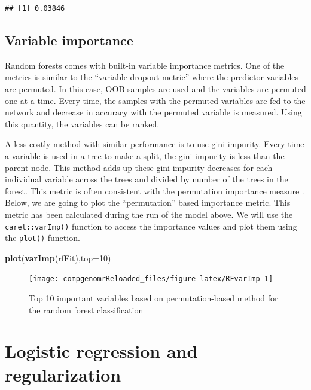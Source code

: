 \documentclass[12pt,]{krantz}
\newenvironment{Shaded}{\begin{snugshade}}{\end{snugshade}}
\newcommand{\DataTypeTok}[1]{\textcolor[rgb]{0.13,0.29,0.53}{#1}}
\newcommand{\DecValTok}[1]{\textcolor[rgb]{0.00,0.00,0.81}{#1}}
\newcommand{\KeywordTok}[1]{\textcolor[rgb]{0.13,0.29,0.53}{\textbf{#1}}}
\newcommand{\NormalTok}[1]{#1}
\begin{document}
\begin{verbatim}
## [1] 0.03846
\end{verbatim}

\hypertarget{variable-importance-1}{%
\subsection{Variable importance}\label{variable-importance-1}}

Random forests comes with built-in variable importance metrics. One of the metrics is similar to the ``variable dropout metric'' where the predictor variables are permuted. In this case, OOB samples are used and the variables are permuted one at a time. Every time, the samples with the permuted variables are fed to the network and decrease in accuracy with the permuted variable is measured. Using this quantity, the variables can be ranked.

A less costly method with similar performance is to use gini impurity. Every time a variable is used in a tree to make a split, the gini impurity is less than the parent node. This method adds up these gini impurity decreases for each individual variable across the trees and divided by number of the trees in the forest. This metric is often consistent with the permutation importance measure \citep{breiman2001random}. Below, we are going to plot the ``permutation'' based importance metric. This metric has been calculated during the run of the model above. We will use the \texttt{caret::varImp()} function to access the importance values and plot them using the \texttt{plot()} function.

\begin{Shaded}
\begin{Highlighting}[]
\KeywordTok{plot}\NormalTok{(}\KeywordTok{varImp}\NormalTok{(rfFit),}\DataTypeTok{top=}\DecValTok{10}\NormalTok{)}
\end{Highlighting}
\end{Shaded}

\begin{figure}

{\centering \texttt{[image: compgenomrReloaded\_files/figure-latex/RFvarImp-1]} 

}

\caption{Top 10 important variables based on permutation-based method for the random forest classification}\label{fig:RFvarImp}
\end{figure}

\hypertarget{logistic-regression-and-regularization}{%
\section{Logistic regression and regularization}\label{logistic-regression-and-regularization}}
\end{document}
